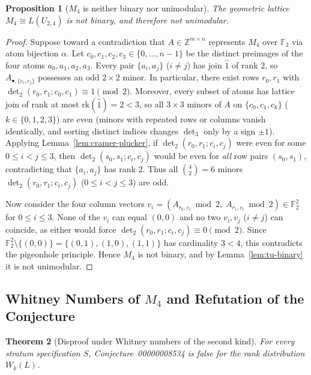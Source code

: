 \documentclass[11pt]{article}
\newtheorem{theorem}{Theorem}[section]
\newtheorem{proposition}[theorem]{Proposition}
\theoremstyle{definition}
\theoremstyle{remark}
\newcommand{\rk}{\mathrm{rk}}
\newcommand{\F}{\mathbb{F}}
\newcommand{\Z}{\mathbb{Z}}
\begin{document}
\begin{proposition}[$M_4$ is neither binary nor unimodular]
\label{prop:m4-not-unimodular}
The geometric lattice $M_4 \cong L(U_{2,4})$ is not binary, and therefore not unimodular.
\end{proposition}

\begin{proof}
Suppose toward a contradiction that $A \in \Z^{m \times n}$ represents $M_4$ over $\F_2$ via atom
bijection $\alpha$. Let $c_0, c_1, c_2, c_3 \in \{0, \dots, n-1\}$ be the distinct preimages of
the four atoms $a_0, a_1, a_2, a_3$. Every pair $\{a_i, a_j\}$ ($i \neq j$) has join $\hat{1}$ of
rank $2$, so $A_{\bullet, \{c_i, c_j\}}$ possesses an odd $2 \times 2$ minor. In particular, there
exist rows $r_0, r_1$ with $\det_2(r_0, r_1; c_0, c_1) \equiv 1 \pmod{2}$. Moreover, every subset
of atoms has lattice join of rank at most $\rk(\hat{1}) = 2 < 3$, so all $3 \times 3$ minors of
$A$ on $\{c_0, c_1, c_k\}$ ($k \in \{0,1,2,3\}$) are even (minors with repeated rows or columns
vanish identically, and sorting distinct indices changes $\det_3$ only by a sign $\pm 1$).
Applying Lemma~\ref{lem:cramer-plucker}, if $\det_2(r_0, r_1; c_i, c_j)$ were even for some
$0 \le i < j \le 3$, then $\det_2(s_0, s_1; c_i, c_j)$ would be even for \emph{all} row pairs
$(s_0, s_1)$, contradicting that $\{a_i, a_j\}$ has rank $2$. Thus all $\binom{4}{2} = 6$ minors
$\det_2(r_0, r_1; c_i, c_j)$ ($0 \le i < j \le 3$) are odd.

Now consider the four column vectors $v_i = (A_{r_0, c_i} \bmod 2,\; A_{r_1, c_i} \bmod 2) \in
\F_2^2$ for $0 \le i \le 3$. None of the $v_i$ can equal $(0,0)$ and no two $v_i, v_j$ ($i \neq j$)
can coincide, as either would force $\det_2(r_0, r_1; c_i, c_j) \equiv 0 \pmod{2}$. Since
$\F_2^2 \setminus \{(0,0)\} = \{(0,1), (1,0), (1,1)\}$ has cardinality $3 < 4$, this contradicts
the pigeonhole principle. Hence $M_4$ is not binary, and by Lemma~\ref{lem:tu-binary} it is not
unimodular.
\end{proof}

\subsection{Whitney Numbers of \texorpdfstring{$M_4$}{M4} and Refutation of the Conjecture}

\begin{theorem}[Disproof under Whitney numbers of the second kind]
\label{thm:disproof-W2}
For every stratum specification $S$, Conjecture~00000008534 is false for the rank distribution
$W_k(L)$.
\end{theorem}
\end{document}

